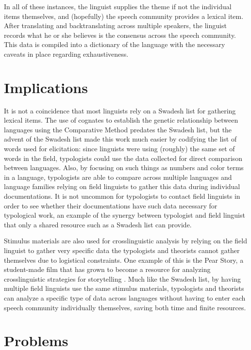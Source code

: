 \documentclass[output=paper,
modfonts
]{langscibook}
\begin{document}
In all of these instances, the linguist supplies the theme if not the individual items themselves, and (hopefully) the speech community provides a lexical item. After translating and backtranslating across multiple speakers, the linguist records what he or she believes is the consensus across the speech community. This data is compiled into a dictionary of the language with the necessary caveats in place regarding exhaustiveness. 

\section{Implications}

It is not a coincidence that most linguists rely on a Swadesh list for gathering lexical items. The use of cognates to establish the genetic relationship between languages using the Comparative Method predates the Swadesh list, but the advent of the Swadesh list made this work much easier by codifying the list of words used for elicitation:  since linguists were using (roughly) the same set of words in the field, typologists could use the data collected for direct comparison between languages. Also, by focusing on such things as numbers and color terms in a language, typologists are able to compare across multiple languages and language families relying on field linguists to gather this data during individual documentations. It is not uncommon for typologists to contact field linguists in order to see whether their documentations have such data necessary for typological work, an example of the synergy between typologist and field linguist that only a shared resource such as a Swadesh list can provide.  

Stimulus materials are also used for crosslinguistic analysis by relying on the field linguist to gather very specific data the typologists and theorists cannot gather themselves due to logistical constraints. One example of this is the Pear Story, a student-made film that has grown to become a resource for analyzing crosslinguistic strategies for storytelling \citep{Chafe1980}. Much like the Swadesh list, by having multiple field linguists use the same stimulus materials, typologists and theorists can analyze a specific type of data across languages without having to enter each speech community individually themselves, saving both time and finite resources. 

\section{Problems}
\end{document}
